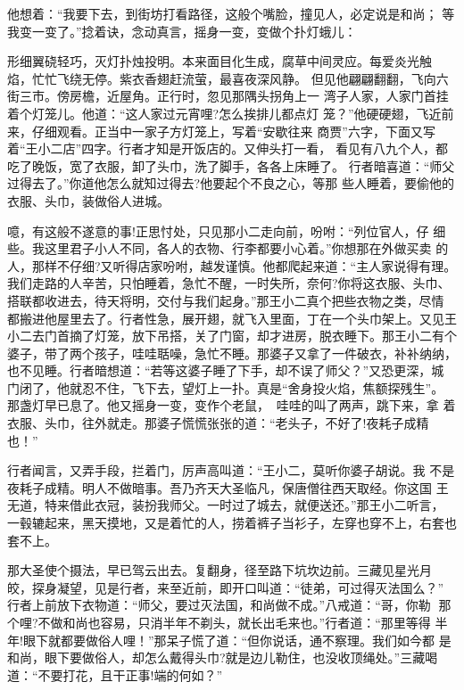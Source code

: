他想着：“我要下去，到街坊打看路径，这般个嘴脸，撞见人，必定说是和尚；
等我变一变了。”捻着诀，念动真言，摇身一变，变做个扑灯蛾儿：

形细翼硗轻巧，灭灯扑烛投明。本来面目化生成，腐草中间灵应。每爱炎光触
焰，忙忙飞绕无停。紫衣香翅赶流萤，最喜夜深风静。
但见他翩翩翻翻，飞向六街三市。傍房檐，近屋角。正行时，忽见那隅头拐角上一
湾子人家，人家门首挂着个灯笼儿。他道：“这人家过元宵哩?怎么挨排儿都点灯
笼？”他硬硬翅，飞近前来，仔细观看。正当中一家子方灯笼上，写着“安歇往来
商贾”六字，下面又写着“王小二店”四字。行者才知是开饭店的。又伸头打一看，
看见有八九个人，都吃了晚饭，宽了衣服，卸了头巾，洗了脚手，各各上床睡了。
行者暗喜道：“师父过得去了。”你道他怎么就知过得去?他要起个不良之心，等那
些人睡着，要偷他的衣服、头巾，装做俗人进城。

噫，有这般不遂意的事!正思忖处，只见那小二走向前，吩咐：“列位官人，仔
细些。我这里君子小人不同，各人的衣物、行李都要小心着。”你想那在外做买卖
的人，那样不仔细?又听得店家吩咐，越发谨慎。他都爬起来道：“主人家说得有理。
我们走路的人辛苦，只怕睡着，急忙不醒，一时失所，奈何?你将这衣服、头巾、
搭联都收进去，待天将明，交付与我们起身。”那王小二真个把些衣物之类，尽情
都搬进他屋里去了。行者性急，展开翅，就飞入里面，丁在一个头巾架上。又见王
小二去门首摘了灯笼，放下吊搭，关了门窗，却才进房，脱衣睡下。那王小二有个
婆子，带了两个孩子，哇哇聒噪，急忙不睡。那婆子又拿了一件破衣，补补纳纳，
也不见睡。行者暗想道：“若等这婆子睡了下手，却不误了师父？”又恐更深，城
门闭了，他就忍不住，飞下去，望灯上一扑。真是“舍身投火焰，焦额探残生”。
那盏灯早已息了。他又摇身一变，变作个老鼠，哇哇的叫了两声，跳下来，拿
着衣服、头巾，往外就走。那婆子慌慌张张的道：“老头子，不好了!夜耗子成精也！”

行者闻言，又弄手段，拦着门，厉声高叫道：“王小二，莫听你婆子胡说。我
不是夜耗子成精。明人不做暗事。吾乃齐天大圣临凡，保唐僧往西天取经。你这国
王无道，特来借此衣冠，装扮我师父。一时过了城去，就便送还。”那王小二听言，
一毂辘起来，黑天摸地，又是着忙的人，捞着裤子当衫子，左穿也穿不上，右套也
套不上。

那大圣使个摄法，早已驾云出去。复翻身，径至路下坑坎边前。三藏见星光月
皎，探身凝望，见是行者，来至近前，即开口叫道：“徒弟，可过得灭法国么？”
行者上前放下衣物道：“师父，要过灭法国，和尚做不成。”八戒道：“哥，你勒
那个哩?不做和尚也容易，只消半年不剃头，就长出毛来也。”行者道：“那里等得
半年!眼下就都要做俗人哩！”那呆子慌了道：“但你说话，通不察理。我们如今都
是和尚，眼下要做俗人，却怎么戴得头巾?就是边儿勒住，也没收顶绳处。”三藏喝
道：“不要打花，且干正事!端的何如？”

